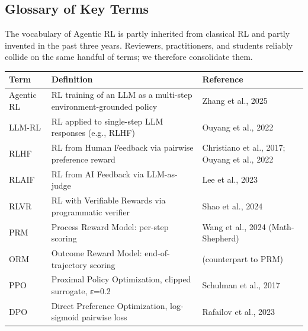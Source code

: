\subsection{Glossary of Key Terms}\label{glossary-of-key-terms}

The vocabulary of Agentic RL is partly inherited from classical RL and partly invented in the past three years. Reviewers, practitioners, and students reliably collide on the same handful of terms; we therefore consolidate them.

{\def\LTcaptype{none} %
\begin{longtable}[]{@{}
  >{\raggedright\arraybackslash}p{}
  >{\raggedright\arraybackslash}p{}
  >{\raggedright\arraybackslash}p{}@{}}
\toprule\noalign{}
\begin{minipage}[b]{\linewidth}\raggedright
Term
\end{minipage} & \begin{minipage}[b]{\linewidth}\raggedright
Definition
\end{minipage} & \begin{minipage}[b]{\linewidth}\raggedright
Reference
\end{minipage} \\
\midrule\noalign{}
\endhead
\bottomrule\noalign{}
\endlastfoot
Agentic RL & RL training of an LLM as a multi-step environment-grounded policy & Zhang et al., 2025 \\
LLM-RL & RL applied to single-step LLM responses (e.g., RLHF) & Ouyang et al., 2022 \\
RLHF & RL from Human Feedback via pairwise preference reward & Christiano et al., 2017; Ouyang et al., 2022 \\
RLAIF & RL from AI Feedback via LLM-as-judge & Lee et al., 2023 \\
RLVR & RL with Verifiable Rewards via programmatic verifier & Shao et al., 2024 \\
PRM & Process Reward Model: per-step scoring & Wang et al., 2024 (Math-Shepherd) \\
ORM & Outcome Reward Model: end-of-trajectory scoring & (counterpart to PRM) \\
PPO & Proximal Policy Optimization, clipped surrogate, ε=0.2 & Schulman et al., 2017 \\
DPO & Direct Preference Optimization, log-sigmoid pairwise loss & Rafailov et al., 2023 \\

\end{longtable}}
